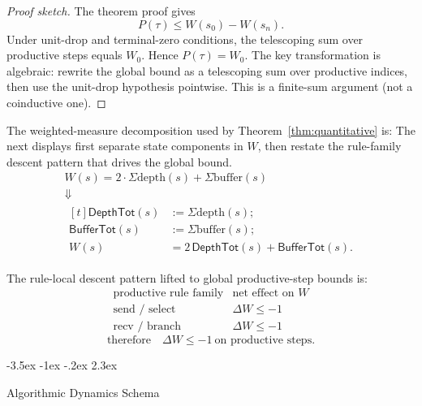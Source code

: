 \documentclass[a4paper,10pt,twocolumn,english]{article}
\makeatletter
\renewcommand{\section}{\@startsection{section}{1}{\z@}%
  {-3.5ex \@plus -1ex \@minus -.2ex}%
  {2.3ex}%
  {\raggedright\normalfont\large\bfseries}}
\numberwithin{equation}{section}
\theoremstyle{paperdef}
\theoremstyle{paperplain}
\theoremstyle{paperdef}
\theoremstyle{paperremark}
\makeatother
\begin{document}
\begin{proof}[Proof sketch]
	The theorem proof gives
	\[
		P(\tau)\le W(s_0)-W(s_n).
	\]
	Under unit-drop and terminal-zero conditions, the telescoping sum over productive steps equals $W_0$. Hence $P(\tau)=W_0$.
	The key transformation is algebraic: rewrite the global bound as a telescoping
	sum over productive indices, then use the unit-drop hypothesis pointwise.
	This is a finite-sum argument (not a coinductive one).
\end{proof}

The weighted-measure decomposition used by Theorem~\ref{thm:quantitative} is:
The next displays first separate state components in $W$, then restate the
rule-family descent pattern that drives the global bound.
\begin{equation}
	\label{eq:p2-weighted-decomposition}
	\begin{array}{c}
		W(s) = 2 \cdot \Sigma\mathrm{depth}(s) + \Sigma\mathrm{buffer}(s)
		\\
		\Downarrow
		\\
		\begin{aligned}[t]
			\mathsf{DepthTot}(s)  & := \Sigma\mathrm{depth}(s);                      \\
			\mathsf{BufferTot}(s) & := \Sigma\mathrm{buffer}(s);                     \\
			W(s)                  & = 2\,\mathsf{DepthTot}(s)+\mathsf{BufferTot}(s).
		\end{aligned}
	\end{array}
\end{equation}

The rule-local descent pattern lifted to global productive-step bounds is:
\begin{equation}
	\label{eq:p2-rule-descent-table}
	\begin{array}{c|c}
		\text{productive rule family} & \text{net effect on }W
		\\
		\hline
		\text{send / select}          & \Delta W \le -1
		\\
		\text{recv / branch}          & \Delta W \le -1
	\end{array}
\end{equation}
\begin{equation}
	\label{eq:p2-rule-descent}
	\text{therefore}\quad \Delta W \le -1\ \text{on productive steps}.
\end{equation}

\section{Algorithmic Dynamics Schema}
\label{sec:theorem2}
\end{document}
